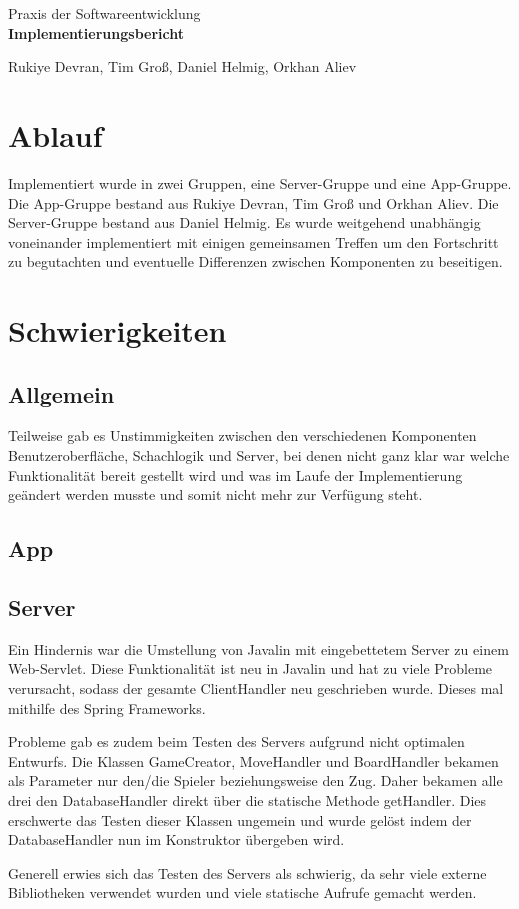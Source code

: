 \documentclass[parskip=full]{scrartcl}
\begin{document}
	\begin{titlepage}
		
		\centering
		\vspace*{0.2\textheight}
		{\Large Praxis der Softwareentwicklung}\\[\baselineskip]
		\vspace{2cm}
		{\Huge \textbf{Implementierungsbericht}}\\[\baselineskip]\par
		\vspace{2cm}
		{\LARGE Rukiye Devran, Tim Groß, Daniel Helmig, Orkhan Aliev}\par		
		\newpage	
		\tableofcontents
		\pagebreak
		
	\end{titlepage}
	\section{Ablauf}
	Implementiert wurde in zwei Gruppen, eine Server-Gruppe und eine App-Gruppe.
	Die App-Gruppe bestand aus Rukiye Devran, Tim Groß und Orkhan Aliev.
	Die Server-Gruppe bestand aus Daniel Helmig.
	Es wurde weitgehend unabhängig voneinander implementiert mit einigen gemeinsamen Treffen um den Fortschritt zu begutachten und eventuelle Differenzen zwischen Komponenten zu beseitigen.
	\section{Schwierigkeiten}
		\subsection{Allgemein} 
		Teilweise gab es Unstimmigkeiten zwischen den verschiedenen Komponenten Benutzeroberfläche, Schachlogik und Server, bei denen nicht ganz klar war welche Funktionalität bereit gestellt wird und was im Laufe der Implementierung geändert werden musste und somit nicht mehr zur Verfügung steht. 
		\subsection{App}
		\subsection{Server}
		Ein Hindernis war die Umstellung von Javalin mit eingebettetem Server zu einem Web-Servlet. Diese Funktionalität ist neu in Javalin und hat zu viele Probleme verursacht, sodass der gesamte ClientHandler neu geschrieben wurde.
		Dieses mal mithilfe des Spring Frameworks.	
		
		Probleme gab es zudem beim Testen des Servers aufgrund nicht optimalen Entwurfs.
		Die Klassen GameCreator, MoveHandler und BoardHandler bekamen als Parameter nur den/die Spieler beziehungsweise den Zug. Daher bekamen alle drei den DatabaseHandler direkt über die statische Methode getHandler. Dies erschwerte das Testen dieser Klassen ungemein und wurde gelöst indem der DatabaseHandler nun im Konstruktor übergeben wird.
		
		Generell erwies sich das Testen des Servers als schwierig, da sehr viele externe Bibliotheken verwendet wurden und viele statische Aufrufe gemacht werden.
		
		
\end{document}
